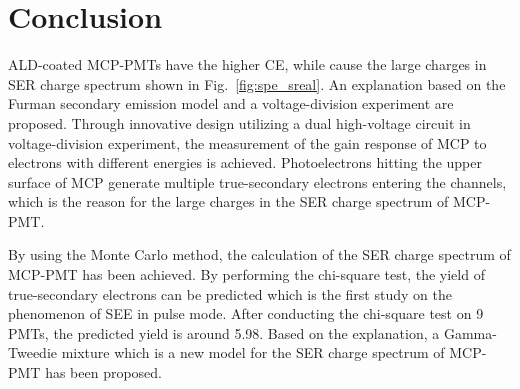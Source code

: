 \section{Conclusion}\label{sec:conclusion}
ALD-coated MCP-PMTs have the higher CE,
while cause the large charges in SER charge spectrum shown in Fig.~\ref{fig:spe_sreal}.
An explanation based on the Furman secondary emission model and a voltage-division experiment are proposed.
Through innovative design utilizing a dual high-voltage circuit in voltage-division experiment,
the measurement of the gain response of MCP to electrons with different energies is achieved.
Photoelectrons hitting the upper surface of MCP generate multiple true-secondary electrons entering the channels,
which is the reason for the large charges in the SER charge spectrum of MCP-PMT.

By using the Monte Carlo method, the calculation of the SER charge spectrum of MCP-PMT has been achieved.
By performing the chi-square test, the yield of true-secondary electrons can be predicted
which is the first study on the phenomenon of SEE in pulse mode.
After conducting the chi-square test on 9 PMTs, the predicted yield is around 5.98.
Based on the explanation, a Gamma-Tweedie mixture which is a new model for the SER charge spectrum of MCP-PMT has been proposed.

